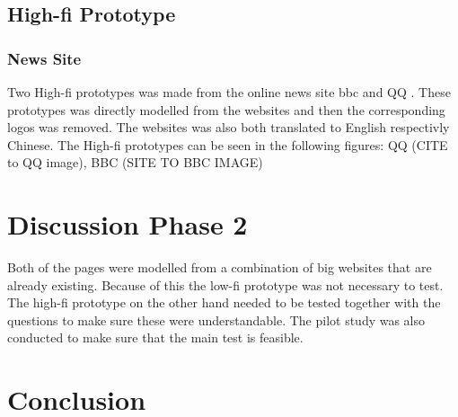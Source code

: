 \subsection{High-fi Prototype}
\subsubsection{News Site}
Two High-fi prototypes was made from the online news site bbc \cite{bbc} and QQ \cite{qq_homepage}. These prototypes was directly modelled from the websites and then the corresponding logos was removed. The websites was also both translated to English respectivly Chinese. The High-fi prototypes can be seen in the following figures: QQ (CITE to QQ image), BBC (SITE TO BBC IMAGE)





\section{Discussion Phase 2}
Both of the pages were modelled from a combination of big websites that are already existing. Because of this the low-fi prototype was not necessary to test. The high-fi prototype on the other hand needed to be tested together with the questions to make sure these were understandable. The pilot study was also conducted to make sure that the main test is feasible. 

\section{Conclusion}


